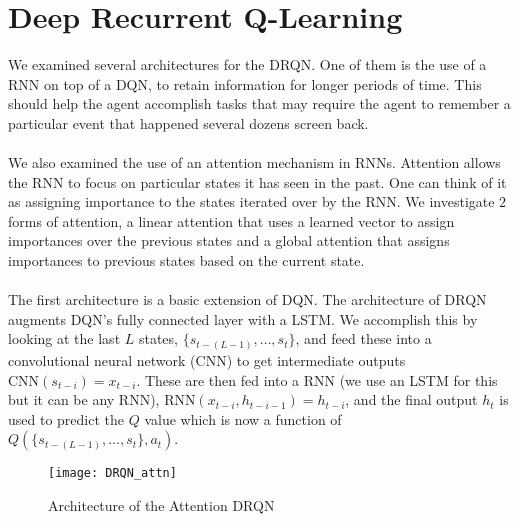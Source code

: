 \documentclass{article}
\begin{document}
\section{Deep Recurrent Q-Learning}

We examined several architectures for the DRQN. One of them is the use of a RNN on top
of a DQN, to retain information for longer periods of time. This should help the
agent accomplish tasks that may require the agent to remember a particular event
that happened several dozens screen back. \\
\\
We also examined the use of an attention
mechanism in RNNs. Attention allows the RNN to focus on particular states it
has seen in the past. One can think of it as assigning importance to the states
iterated over by the RNN. We investigate $2$ forms of attention, a linear attention
that uses a learned vector to assign importances over the previous states and a
global attention that assigns importances to previous states based on the current
state. \\
\\
The first architecture is a basic extension of DQN. The architecture of DRQN
augments DQN's fully connected layer with a LSTM. We accomplish this by looking at
the last $L$ states, $\{s_{t-(L-1)}, \dots, s_{t}\}$, and feed these into a
convolutional neural network (CNN) to get intermediate outputs
$\text{CNN}(s_{t-i}) = x_{t-i}$. These are then fed into a RNN (we use an LSTM for
this but it can be any RNN), $\text{RNN}(x_{t-i}, h_{t-i-1}) = h_{t-i}$, and the
final output $h_t$ is used to predict the $Q$ value which is now a function of
$Q(\{s_{t-(L-1)}, \dots, s_t\}, a_t)$.

\begin{figure}[h]
    \centering
    \texttt{[image: DRQN\_attn]}
    \caption{Architecture of the Attention DRQN}
\end{figure}
\end{document}
